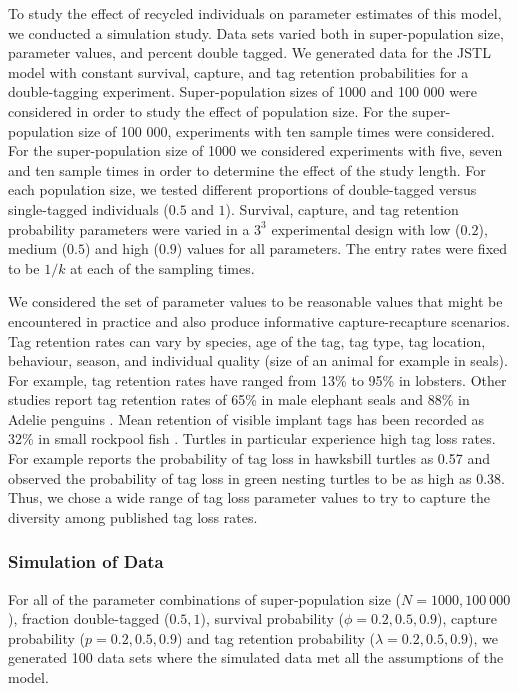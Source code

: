 \documentclass[12pt]{article}
\begin{document}
To study the effect of recycled individuals on parameter estimates of
this model, we conducted a simulation study. Data sets varied both in super-population size,
parameter values, and percent double tagged. We generated data for the
JSTL model with constant survival, capture, and tag retention
probabilities for a double-tagging experiment. Super-population sizes of
1000 and 100 000 were considered in order to study the effect of population size. For the super-population size
of 100 000, experiments with ten sample times were considered. For
the super-population size of 1000 we considered experiments with five,
seven and ten sample times in order to determine the effect of the study length. For each population size, we
tested different proportions of double-tagged versus single-tagged
individuals (\(0.5\) and \(1\)). Survival, capture, and tag retention
probability parameters were varied in a \(3^3\) experimental design with
low (\(0.2\)), medium (\(0.5\)) and high (\(0.9\)) values for all
parameters. The entry rates were fixed to be $1/k$ at each of the
sampling times. 

We considered the set of parameter values to be reasonable values that might be encountered in practice and also produce informative capture-recapture scenarios.  Tag retention rates can vary by species, age of the tag, tag type, tag location, behaviour, season, and individual quality (size of an animal for example in seals).  For example, tag retention rates have ranged from 13\% \citep{Fogarty:1980} to 95\% \citep{Gonzalez:2012} in lobsters.  Other studies report tag retention rates of 65\% in male elephant seals \citep{Pistorius:2000} and 88\% in Adelie penguins \citep{Ainley:1980}.  Mean retention of visible implant tags has been recorded as 32\% in small rockpool fish \citep{Griffiths:2002}. Turtles in particular experience high tag loss rates.  For example \cite{Bellini:2001} reports the probability of tag loss in hawksbill turtles as 0.57 and    \cite{Bjorndal:1996} observed the probability of tag loss  in green nesting turtles to be as high as 0.38.   Thus, we chose a wide range of tag loss parameter values to try to capture the diversity among published tag loss rates.

\subsubsection{Simulation of Data}\label{simulation-of-data}

For all of the parameter combinations of super-population size
(\(N=1 000, 100 \ 000\)), fraction double-tagged (\(0.5, 1\)), survival
probability (\(\phi=0.2,0.5,0.9\)), capture probability
(\(p=0.2,0.5,0.9\)) and tag retention probability
(\(\lambda=0.2,0.5,0.9\)), we generated 100 data sets where the
simulated data met all the assumptions of the model.
\end{document}
